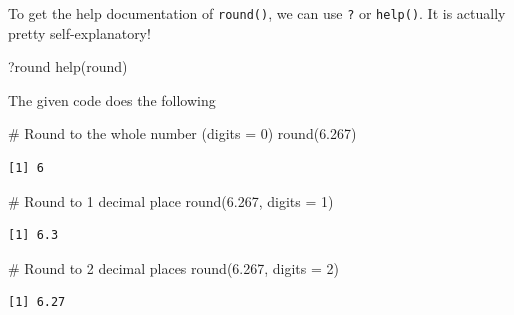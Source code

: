 \documentclass[
  letterpaper,
  DIV=11,
  numbers=noendperiod]{scrreprt}
\newenvironment{Shaded}{\begin{snugshade}}{\end{snugshade}}
\newcommand{\AttributeTok}[1]{\textcolor[rgb]{0.40,0.45,0.13}{#1}}
\newcommand{\CommentTok}[1]{\textcolor[rgb]{0.37,0.37,0.37}{#1}}
\newcommand{\DecValTok}[1]{\textcolor[rgb]{0.68,0.00,0.00}{#1}}
\newcommand{\FloatTok}[1]{\textcolor[rgb]{0.68,0.00,0.00}{#1}}
\newcommand{\FunctionTok}[1]{\textcolor[rgb]{0.28,0.35,0.67}{#1}}
\newcommand{\NormalTok}[1]{\textcolor[rgb]{0.00,0.23,0.31}{#1}}
\begin{document}
\begin{tcolorbox}[enhanced jigsaw, colbacktitle=quarto-callout-tip-color!10!white, opacitybacktitle=0.6, breakable, left=2mm, leftrule=.75mm, toprule=.15mm, toptitle=1mm, bottomtitle=1mm, colframe=quarto-callout-tip-color-frame, opacityback=0, coltitle=black, arc=.35mm, titlerule=0mm, colback=white, bottomrule=.15mm, title=\textcolor{quarto-callout-tip-color}{\faLightbulb}\hspace{0.5em}{Answer}, rightrule=.15mm]

To get the help documentation of \texttt{round()}, we can use \texttt{?}
or \texttt{help()}. It is actually pretty self-explanatory!

\begin{Shaded}
\begin{Highlighting}[]
\NormalTok{?round}
\FunctionTok{help}\NormalTok{(round)}
\end{Highlighting}
\end{Shaded}

The given code does the following

\begin{Shaded}
\begin{Highlighting}[]
\CommentTok{\# Round to the whole number (digits = 0)}
\FunctionTok{round}\NormalTok{(}\FloatTok{6.267}\NormalTok{)}
\end{Highlighting}
\end{Shaded}

\begin{verbatim}
[1] 6
\end{verbatim}

\begin{Shaded}
\begin{Highlighting}[]
\CommentTok{\# Round to 1 decimal place}
\FunctionTok{round}\NormalTok{(}\FloatTok{6.267}\NormalTok{, }\AttributeTok{digits =} \DecValTok{1}\NormalTok{)}
\end{Highlighting}
\end{Shaded}

\begin{verbatim}
[1] 6.3
\end{verbatim}

\begin{Shaded}
\begin{Highlighting}[]
\CommentTok{\# Round to 2 decimal places}
\FunctionTok{round}\NormalTok{(}\FloatTok{6.267}\NormalTok{, }\AttributeTok{digits =} \DecValTok{2}\NormalTok{)}
\end{Highlighting}
\end{Shaded}

\begin{verbatim}
[1] 6.27
\end{verbatim}

\end{tcolorbox}
\end{document}

